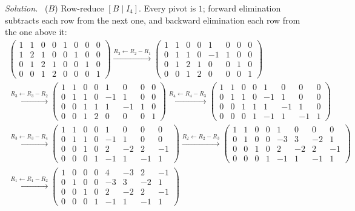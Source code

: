 \documentclass[12pt]{article}
\theoremstyle{definition}
\newenvironment{solution}{\par\noindent\textit{Solution.}\ }{\par\smallskip}
\begin{document}
\begin{solution}
(\(B\)) Row-reduce \([B\mid I_4]\). Every pivot is \(1\); forward elimination subtracts each row from the next one,
and backward elimination each row from the one above it:
\[
\begin{gathered}
\left(\begin{array}{cccc|cccc}1&1&0&0&1&0&0&0\\1&2&1&0&0&1&0&0\\0&1&2&1&0&0&1&0\\0&0&1&2&0&0&0&1\end{array}\right)
\xrightarrow{R_2\leftarrow R_2-R_1}
\left(\begin{array}{cccc|cccc}1&1&0&0&1&0&0&0\\0&1&1&0&-1&1&0&0\\0&1&2&1&0&0&1&0\\0&0&1&2&0&0&0&1\end{array}\right)
\\
\xrightarrow{R_3\leftarrow R_3-R_2}
\left(\begin{array}{cccc|cccc}1&1&0&0&1&0&0&0\\0&1&1&0&-1&1&0&0\\0&0&1&1&1&-1&1&0\\0&0&1&2&0&0&0&1\end{array}\right)
\xrightarrow{R_4\leftarrow R_4-R_3}
\left(\begin{array}{cccc|cccc}1&1&0&0&1&0&0&0\\0&1&1&0&-1&1&0&0\\0&0&1&1&1&-1&1&0\\0&0&0&1&-1&1&-1&1\end{array}\right)
\\
\xrightarrow{R_3\leftarrow R_3-R_4}
\left(\begin{array}{cccc|cccc}1&1&0&0&1&0&0&0\\0&1&1&0&-1&1&0&0\\0&0&1&0&2&-2&2&-1\\0&0&0&1&-1&1&-1&1\end{array}\right)
\xrightarrow{R_2\leftarrow R_2-R_3}
\left(\begin{array}{cccc|cccc}1&1&0&0&1&0&0&0\\0&1&0&0&-3&3&-2&1\\0&0&1&0&2&-2&2&-1\\0&0&0&1&-1&1&-1&1\end{array}\right)
\\
\xrightarrow{R_1\leftarrow R_1-R_2}
\left(\begin{array}{cccc|cccc}1&0&0&0&4&-3&2&-1\\0&1&0&0&-3&3&-2&1\\0&0&1&0&2&-2&2&-1\\0&0&0&1&-1&1&-1&1\end{array}\right)

\end{gathered}\]
\end{solution}
\end{document}
